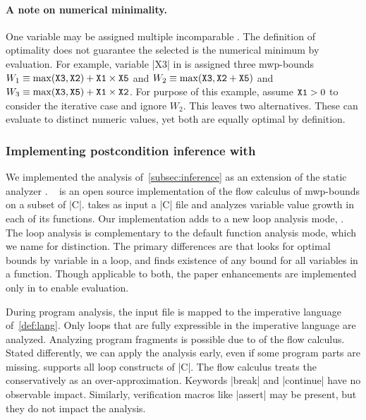 \paragraph*{A note on numerical minimality.}
One variable may be assigned multiple incomparable . The
definition of optimality does not guarantee the
selected  is the numerical minimum by evaluation. For
example, variable \pr|X3| in \exname is assigned three mwp-bounds \(W_1 \equiv
\max(\prm{X3},\prm{X2})+\prm{X1} \times \prm{X5} \) and \(W_2 \equiv
\max(\prm{X3},\prm{X2}+\prm{X5}) \) and \(W_3 \equiv
\max(\prm{X3},\prm{X5})+\prm{X1} \times \prm{X2} \).
For purpose of this example, assume \(\prm{X1}>0\) to consider the iterative
case and ignore \(W_2\). This leaves two alternatives. These can
evaluate to distinct numeric values, yet both are equally optimal by
definition.

\subsubsection{Implementing postcondition inference with \impl}
\label{subsec:implementation}

We implemented the analysis of~\autoref{subsec:inference} as an extension of the
static analyzer . ~\cite{aubert2023b} is an open source
implementation of the flow calculus of mwp-bounds  on a
subset of \pr|C|.  takes as input a \pr|C| file and analyzes
variable value growth in each of its functions. Our implementation adds to
 a new loop analysis mode, \ndx{\impl}. The loop analysis is
complementary to the default function analysis mode, which we name \ndx{\impf}
for distinction. The primary differences are that \ndx{\impl} looks for
{optimal} bounds by variable in a {loop}, and
\ndx{\impf} finds existence of {any} bound for all variables in a {function}.
Though applicable to both, the paper enhancements are implemented only in
\ndx{\impl} to enable evaluation.

During program analysis, the input file is mapped to the imperative language
of~\autoref{def:lang}. Only loops that are fully
expressible in the imperative language are analyzed. Analyzing program fragments
is possible due to  of the flow
calculus. Stated differently, we can apply the analysis
early, even if some program parts are missing.  supports all loop
constructs of \pr|C|. The flow calculus treats the  conservatively as an over-approximation. Keywords \pr|break| and
\pr|continue| have no observable impact. Similarly, verification macros like
\pr|assert| may be present, but they do not impact the
analysis.

